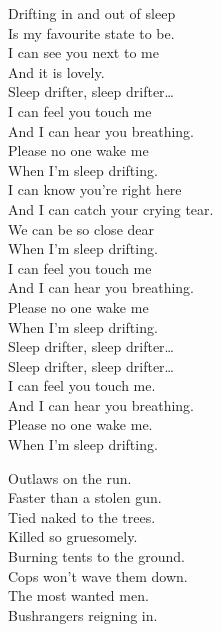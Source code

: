 Drifting in and out of sleep \\
Is my favourite state to be. \\
I can see you next to me \\
And it is lovely. \\

Sleep drifter, sleep drifter… \\

I can feel you touch me \\
And I can hear you breathing. \\
Please no one wake me \\
When I'm sleep drifting. \\

I can know you're right here \\
And I can catch your crying tear. \\
We can be so close dear \\
When I'm sleep drifting. \\

I can feel you touch me \\
And I can hear you breathing. \\
Please no one wake me \\
When I'm sleep drifting. \\

Sleep drifter, sleep drifter… \\
Sleep drifter, sleep drifter… \\

I can feel you touch me. \\
And I can hear you breathing. \\
Please no one wake me. \\
When I'm sleep drifting. \\





Outlaws on the run. \\
Faster than a stolen gun. \\
Tied naked to the trees. \\
Killed so gruesomely. \\
Burning tents to the ground. \\
Cops won't wave them down. \\
The most wanted men. \\
Bushrangers reigning in. \\

